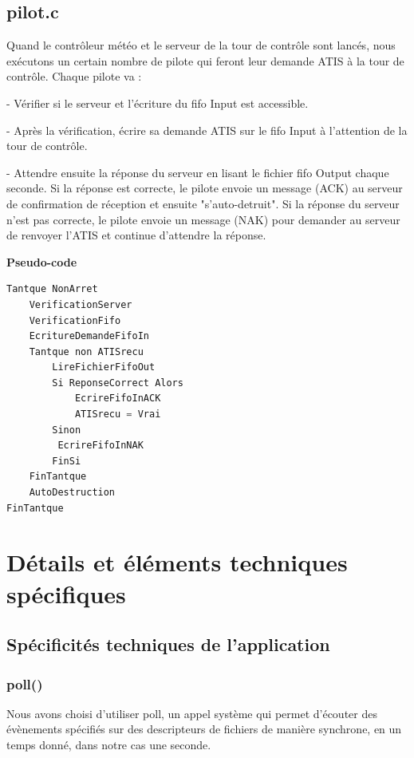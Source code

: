 \documentclass{report}
\begin{document}
{	\section{pilot.c}
		
 Quand le contrôleur météo et le serveur de la tour de contrôle sont lancés, nous exécutons un certain nombre de pilote qui feront leur demande ATIS à la tour de contrôle.
		Chaque pilote va : 
		
		- Vérifier si le serveur et l'écriture du fifo Input est accessible.
		
		- Après la vérification, écrire sa demande ATIS sur le fifo Input à l'attention de la tour de contrôle.
		
		- Attendre ensuite la réponse du serveur en lisant le fichier fifo Output chaque seconde. Si la réponse est correcte, le pilote envoie un message (ACK) au serveur de confirmation de réception et ensuite "s'auto-detruit".  Si la réponse du serveur n'est pas correcte, le pilote envoie un message (NAK) pour demander au serveur de renvoyer l'ATIS et continue d'attendre la réponse.
\newline

\textbf{Pseudo-code}

\begin{lstlisting}[language=C]
Tantque NonArret
	VerificationServer
	VerificationFifo
	EcritureDemandeFifoIn
	Tantque non ATISrecu
		LireFichierFifoOut
		Si ReponseCorrect Alors
			EcrireFifoInACK
			ATISrecu = Vrai 
		Sinon
		 EcrireFifoInNAK
		FinSi
	FinTantque
	AutoDestruction
FinTantque 
\end{lstlisting}

\chapter{Détails et éléments techniques spécifiques}

	\section{Spécificités techniques de l'application}

		\subsection{poll()}

                        Nous avons choisi d'utiliser poll\cite{sysCalls}, un appel système qui permet d'écouter des évènements spécifiés sur des descripteurs de fichiers de manière synchrone, en un temps donné, dans notre cas une seconde.

}
\end{document}
